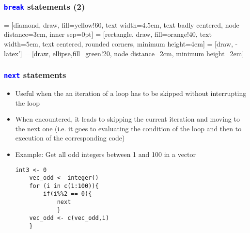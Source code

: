 \documentclass[10pt]{beamer}
\newcommand{\cc}[1]{\texttt{\textcolor{blue}{#1}}}
\theoremstyle{definition}
\begin{document}
\begin{frame}[fragile]
\frametitle{\cc{break} statements (2)}
 = [diamond, draw, fill=yellow!60, 
    text width=4.5em, text badly centered, node distance=3cm, inner sep=0pt]
 = [rectangle, draw, fill=orange!40, 
    text width=5em, text centered, rounded corners, minimum height=4em]
 = [draw, -latex']
 = [draw, ellipse,fill=green!20, node distance=2cm,
    minimum height=2em]

\begin{center}
\end{center} 
\end{frame}

\begin{frame}[fragile]
\frametitle{\cc{next} statements}
\begin{itemize}
	\item Useful when the an iteration of a loop has to be skipped without interrupting the loop
	\item When encountered, it leads to skipping the current iteration and moving to the next one (i.e. it goes to evaluating the condition of the loop and then to execution of the corresponding code)
	\item Example: Get all odd integers between 1 and 100 in a vector
	\begin{lstlisting}[style = rstyle, breaklines]
	int3 <- 0
	vec_odd <- integer()
	for (i in c(1:100)){
		if(i%%2 == 0){
			next  
			}
	vec_odd <- c(vec_odd,i)
	}
	\end{lstlisting}
\end{itemize}
\end{frame}
\end{document}
